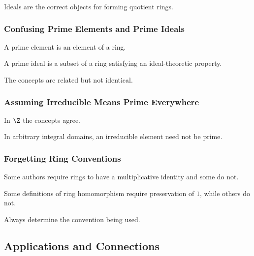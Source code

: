 Ideals are the correct objects for forming quotient rings.

\subsubsection{Confusing Prime Elements and Prime Ideals}

A prime element is an element of a ring.

A prime ideal is a subset of a ring satisfying an ideal-theoretic property.

The concepts are related but not identical.

\subsubsection{Assuming Irreducible Means Prime Everywhere}

In \(\Z\) the concepts agree.

In arbitrary integral domains, an irreducible element need not be prime.

\subsubsection{Forgetting Ring Conventions}

Some authors require rings to have a multiplicative identity and some do not.

Some definitions of ring homomorphism require preservation of \(1\), while
others do not.

Always determine the convention being used.

\subsection{Applications and Connections}
\label{subsec:ring-applications}

